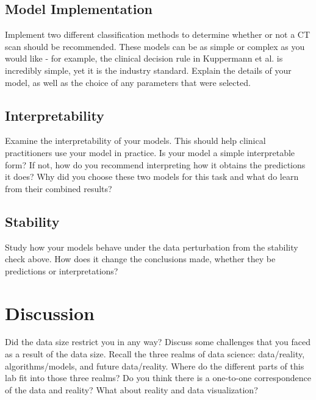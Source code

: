 \documentclass[10pt,letterpaper]{article}
\begin{document}
\subsection*{Model Implementation}

Implement two different classification methods to determine whether or not a CT scan should be recommended. These models can be as simple or complex as you would like - for example, the clinical decision rule in Kuppermann et al. is incredibly simple, yet it is the industry standard. Explain the details of your model, as well as the choice of any parameters that were selected.

\subsection*{Interpretability}

Examine the interpretability of your models. This should help clinical practitioners use your model in practice. Is your model a simple interpretable form? If not, how do you recommend interpreting how it obtains the predictions it does? Why did you choose these two models for this task and what do learn from their combined results?

\subsection*{Stability}

Study how your models behave under the data perturbation from the stability check above. How does it change the conclusions made, whether they be predictions or interpretations?

\section*{Discussion}

Did the data size restrict you in any way? Discuss some challenges that you faced as a result of the data size. Recall the three realms of data science: data/reality, algorithms/models, and future data/reality. Where do the different parts of this lab fit into those three realms? Do you think there is a one-to-one correspondence of the data and reality? What about reality and data visualization?
\end{document}
